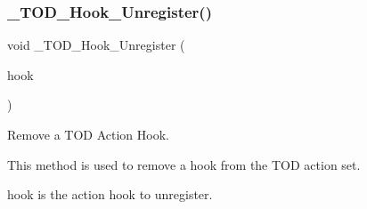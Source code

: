 \subsubsection{\texorpdfstring{\_TOD\_Hook\_Unregister()}{\_TOD\_Hook\_Unregister()}}
{\footnotesize\ttfamily void \+\_\+\+T\+O\+D\+\_\+\+Hook\+\_\+\+Unregister (\begin{DoxyParamCaption}\item[{\mbox{\hyperlink{structTOD__Hook}{T\+O\+D\+\_\+\+Hook}} $\ast$}]{hook }\end{DoxyParamCaption})}



Remove a T\+OD Action Hook. 

This method is used to remove a hook from the T\+OD action set.

hook is the action hook to unregister. 